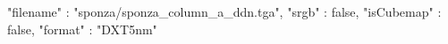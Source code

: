 { 
	"filename" : "sponza/sponza_column_a_ddn.tga", 
	"srgb" : false,
	"isCubemap" : false,
	"format" : "DXT5nm"
}